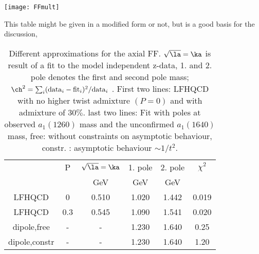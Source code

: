 \texttt{[image: FFmult]}


This table might be given in a modified form or not, but is a good
basis for the discussion,

\begin{table}\bec
\begin{tabular}{c c|c| c c |c}
&P&$\sqrt{\la}=\ka$ & 1. pole & 2. pole & $\chi^2$\\
&&GeV&GeV&GeV&\\
LFHQCD& 0 &0.510&1.020&1.442&0.019\\
LFHQCD& 0.3 &0.545&1.090&1.541&0.020\\
dipole,free&-&-&1.230&1.640&0.25\\
dipole,constr&-&-&1.230&1.640&1.20\\
\end{tabular} \enc
\caption{Different approximations for the axial FF.
$\sqrt{\la}=\ka$ is result of a fit to the model independent
z-data, 1. and 2. pole denotes the first and second pole mass;
$\ch^2= \sum_i({\rm data}_i  - {\rm fit}_i)^2/{\rm data}_i$ .
First two lines: LFHQCD with no  higher twist admixture $(P=0)$
and with admixture of $30 \%$. last two lines: Fit with poles at
observed $a_1(1260)$ mass and the unconfirmed $a_1(1640)$ mass,
free: without constraints on asymptotic behaviour, constr. :
asymptotic behaviour $\sim 1/t^2$. }
\end{table}
























